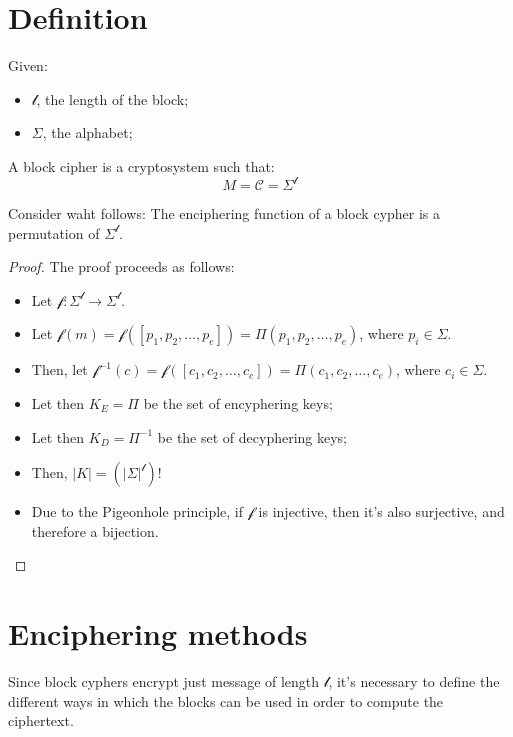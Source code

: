 \section{Definition}
Given:
\begin{itemize}
    \item $\mathcal{l}$, the length of the block;
    \item $\Sigma$, the alphabet;
\end{itemize}
A block cipher is a cryptosystem such that:
\[M = \mathcal{C} = \Sigma^{\mathcal{l}}\]
\begin{proposition}
    Consider waht follows:\newline
    The enciphering function of a block cypher is a permutation of $\Sigma^{\mathcal{l}}$.
\end{proposition}
\begin{proof}
    The proof proceeds as follows:
    \begin{itemize}
        \item Let $\mathcal{f}: \Sigma^{\mathcal{l}} \rightarrow \Sigma^{\mathcal{l}}$.
        \item Let $\mathcal{f}(m) = \mathcal{f}([p_{1}, p_{2}, \dots, p_{e}]) = \Pi(p_{1}, p_{2}, \dots, p_{e})$, where $p_{i} \in \Sigma$.
        \item Then, let $\mathcal{f}^{-1}(c) = \mathcal{f}([c_{1}, c_{2}, \dots, c_{e}]) = \Pi(c_{1}, c_{2}, \dots, c_{e})$, where $c_{i} \in \Sigma$.
        \item Let then $K_{E} = \Pi$ be the set of encyphering keys;
        \item Let then $K_{D} = \Pi^{-1}$ be the set of decyphering keys;
        \item Then, $|K| = (|\Sigma|^{\mathcal{l}})!$
        \item Due to the Pigeonhole principle, if $\mathcal{f}$ is injective, then it's also surjective, and therefore a bijection.
    \end{itemize}
\end{proof}

\section{Enciphering methods}
Since block cyphers encrypt just message of length $\mathcal{l}$, it's necessary to define the different ways in which the blocks can be used in order to compute the ciphertext.
